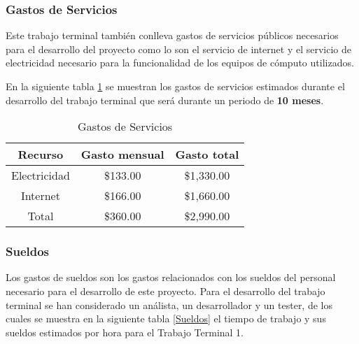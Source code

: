 \subsubsection{Gastos de Servicios}
Este trabajo terminal también conlleva gastos de servicios públicos necesarios para el desarrollo del proyecto como lo son el servicio de internet y el servicio de electricidad necesario para la funcionalidad de los equipos de cómputo utilizados.

En la siguiente tabla \ref{GastosServicios} se muestran los gastos de servicios estimados durante el desarrollo del trabajo terminal que será durante un periodo de \textbf{10 meses}.

\begin{table}[H]
	\centering
	\resizebox{10cm}{!} {
		\begin{tabular}{|c|c|c|}
			\hline
			\multicolumn{1}{|c|}{Recurso} & Gasto mensual & Gasto total\\ \hline
			Electricidad & \$133.00  & \$1,330.00 \\ \hline
			Internet & \$166.00  & \$1,660.00 \\ \hline
			Total  & \$360.00 & \$2,990.00 \\ \hline
			
		\end{tabular}
	}
	\caption{Gastos de Servicios}
	\label{GastosServicios}
\end{table} 

\subsubsection{Sueldos}
Los gastos de sueldos son los gastos relacionados con los sueldos del personal necesario para el desarrollo de este proyecto. Para el desarrollo del trabajo terminal se han considerado un análista, un desarrollador y un tester, de los cuales se muestra en la siguiente tabla \ref{Sueldos} el tiempo de trabajo y sus sueldos estimados por hora para el Trabajo Terminal 1.


